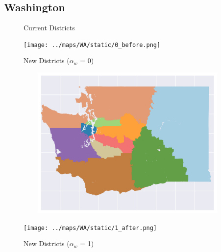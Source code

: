 \subsection{Washington}
\begin{figure}[htb!] \centering
\caption{ Current Districts }
\texttt{[image: ../maps/WA/static/0\_before.png]}
\caption{ New Districts ($\alpha_w$ = 0) }
\includegraphics[width=5in,height=3in,keepaspectratio]{../maps/WA/static/0_after.png}
\caption{ New Districts ($\alpha_w$ = 1) }
\texttt{[image: ../maps/WA/static/1\_after.png]}
\end{figure}

\clearpage
\newpage

